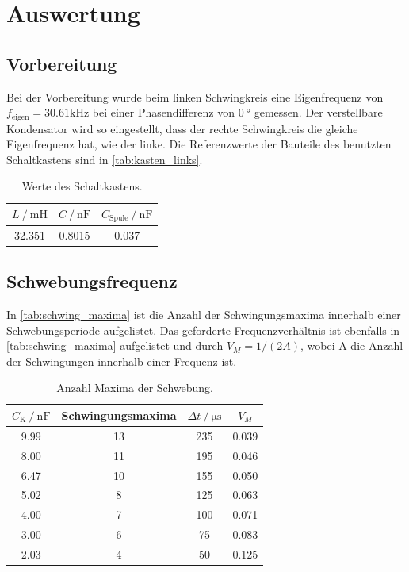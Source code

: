 \section{Auswertung}
\label{sec:Auswertung}

\subsection{Vorbereitung}
Bei der Vorbereitung wurde beim linken Schwingkreis eine Eigenfrequenz von $f_{\text{eigen}}=30.61 \si{\kilo\hertz}$ bei einer
Phasendifferenz von $\SI{0}{\degree}$ gemessen. 
Der verstellbare Kondensator wird so eingestellt, dass der rechte Schwingkreis die gleiche Eigenfrequenz hat, wie der linke.
Die Referenzwerte der Bauteile des benutzten Schaltkastens sind in \autoref{tab:kasten_links}.


\begin{table}[H]
  \centering
  \caption{Werte des Schaltkastens.}
  \label{tab:kasten_links}
  \begin{tabular}{c c c}
      \toprule
      {$L \:/\: \si{\milli\henry} $} & $C \:/\: \si{\nano\farad} $ & $C_{\text{Spule}}\:/\: \si{\nano\farad}$ \\
      \midrule
      32.351 & 0.8015 & 0.037 \\
      \bottomrule
  \end{tabular}
\end{table}


\subsection{Schwebungsfrequenz}
In \autoref{tab:schwing_maxima} ist die Anzahl der Schwingungsmaxima innerhalb einer Schwebungsperiode aufgelistet.
Das geforderte Frequenzverhältnis ist ebenfalls in \autoref{tab:schwing_maxima} aufgelistet und durch $V_M  = 1/(2A) $, wobei A die Anzahl
der Schwingungen innerhalb einer Frequenz ist.

\begin{table}[H]
  \centering
  \caption{Anzahl Maxima der Schwebung.}
  \label{tab:schwing_maxima}
  \begin{tabular}{c c c c}
      \toprule
      {$C_{\text{K}} \:/\: \si{\nano\farad}$} & Schwingungsmaxima & $\Delta t\:/\: \si{\micro\second}$ & $V_M$ \\
      \midrule
      9.99 & 13 & 235 & 0.039 \\ 
      8.00 & 11 & 195 & 0.046 \\ 
      6.47 & 10 & 155 & 0.050 \\ 
      5.02 & 8 & 125 & 0.063 \\ 
      4.00 & 7 & 100 & 0.071 \\
      3.00 & 6 & 75 & 0.083 \\
      2.03 & 4 & 50 & 0.125 \\ 
      \bottomrule
  \end{tabular}
\end{table}

